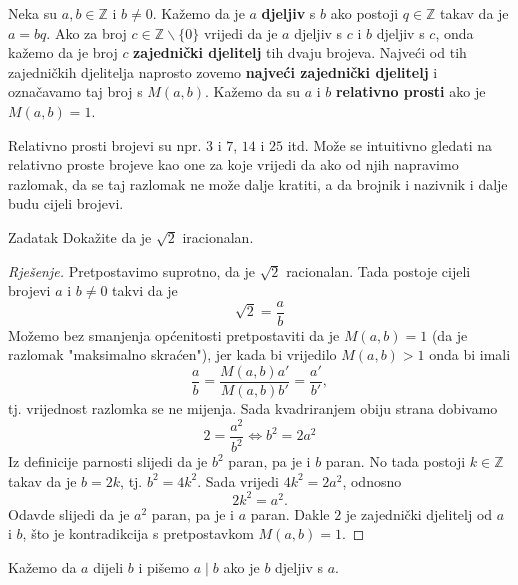 \begin{definition}
Neka su \(a, b\in \mathbb{Z}\) i \(b\neq 0\). Kažemo da je \(a\) \textbf{djeljiv} s \(b\) ako postoji \(q\in \mathbb{Z}\) takav da je \(a=bq\). Ako za broj \(c\in \mathbb{Z}\backslash \{0\}\) vrijedi da je \(a\) djeljiv s \(c\) i \(b\) djeljiv s \(c\), onda kažemo da je broj \(c\) \textbf{zajednički djelitelj} tih dvaju brojeva. Najveći od tih zajedničkih djelitelja naprosto zovemo \textbf{najveći zajednički djelitelj} i označavamo taj broj s \(M(a, b)\). Kažemo da su \(a\) i \(b\) \textbf{relativno prosti} ako je \(M(a, b)=1\).
\end{definition}

Relativno prosti brojevi su npr. \(3\) i \(7\), \(14\) i \(25\) itd. Može se intuitivno gledati na relativno proste brojeve kao one za koje vrijedi da ako od njih napravimo razlomak, da se taj razlomak ne može dalje kratiti, a da brojnik i nazivnik i dalje budu cijeli brojevi.

\begin{exercise}{Zadatak}
\label{classiccontradictionproof}
Dokažite da je \(\sqrt{2}\) iracionalan.
\end{exercise}
\begin{proof}[Rješenje]
Pretpostavimo suprotno, da je \(\sqrt{2}\) racionalan. Tada postoje cijeli brojevi \(a\) i \(b\neq 0\) takvi da je
\[\sqrt{2}=\dfrac{a}{b}\]
Možemo bez smanjenja općenitosti pretpostaviti da je \(M(a, b)=1\) (da je razlomak "maksimalno skraćen"), jer kada bi vrijedilo \(M(a, b)>1\) onda bi imali
\[\dfrac{a}{b}=\dfrac{M(a, b)a'}{M(a, b)b'}=\dfrac{a'}{b'},\]
tj. vrijednost razlomka se ne mijenja. Sada kvadriranjem obiju strana dobivamo
\[2=\dfrac{a^2}{b^2}\Leftrightarrow b^2=2a^2\]
Iz definicije parnosti slijedi da je \(b^2\) paran, pa je i \(b\) paran. No tada postoji \(k\in \mathbb{Z}\) takav da je \(b=2k\), tj. \(b^2=4k^2\). Sada vrijedi \(4k^2=2a^2\), odnosno \[2k^2=a^2.\] Odavde slijedi da je \(a^2\) paran, pa je i \(a\) paran. Dakle \(2\) je zajednički djelitelj od \(a\) i \(b\), što je kontradikcija s pretpostavkom \(M(a, b)=1\).
\end{proof}

\begin{definition}
Kažemo da \(a\) dijeli \(b\) i pišemo \(a\; \vert \;b\) ako je \(b\) djeljiv s \(a\).
\end{definition}

